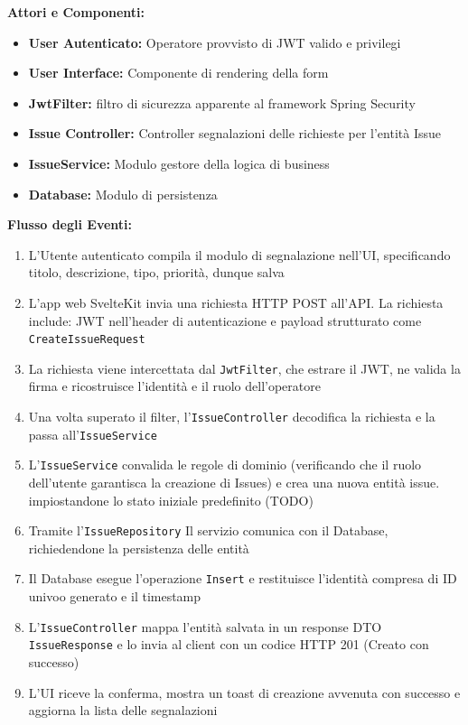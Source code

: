\textbf{Attori e Componenti:}

\begin{itemize}
    \item \textbf{User Autenticato:} Operatore provvisto di JWT valido e privilegi
    \item \textbf{User Interface:} Componente di rendering della form
    \item \textbf{JwtFilter:} filtro di sicurezza apparente al framework Spring Security
    \item \textbf{Issue Controller:} Controller segnalazioni delle richieste per l'entità Issue
    \item \textbf{IssueService:} Modulo gestore della logica di business
    \item \textbf{Database:} Modulo di persistenza
\end{itemize}

\textbf{Flusso degli Eventi:}
\begin{enumerate}
    \item L'Utente autenticato compila il modulo di segnalazione nell'UI, specificando titolo, descrizione, tipo, priorità, dunque salva
    \item L'app web SvelteKit invia una richiesta HTTP POST all'API. La richiesta include: JWT nell'header di autenticazione e payload strutturato come \texttt{CreateIssueRequest} 
    \item La richiesta viene intercettata dal \texttt{JwtFilter}, che estrare il JWT, ne valida la firma e ricostruisce l'identità e il ruolo dell'operatore
    \item Una volta superato il filter, l'\texttt{IssueController} decodifica la richiesta e la passa all'\texttt{IssueService}
    \item L'\texttt{IssueService} convalida le regole di dominio (verificando che il ruolo dell'utente garantisca la creazione di Issues) e crea una nuova entità issue. impiostandone lo stato iniziale predefinito (TODO)
    \item Tramite l'\texttt{IssueRepository} Il servizio comunica con il Database, richiedendone la persistenza delle entità
    \item Il Database esegue l'operazione \texttt{Insert} e restituisce l'identità compresa di ID univoo generato e il timestamp
    \item L'\texttt{IssueController} mappa l'entità salvata in un response DTO \texttt{IssueResponse} e lo invia al client con un codice HTTP 201 (Creato con successo)
    \item L'UI riceve la conferma, mostra un toast di creazione avvenuta con successo e aggiorna la lista delle segnalazioni        
\end{enumerate}